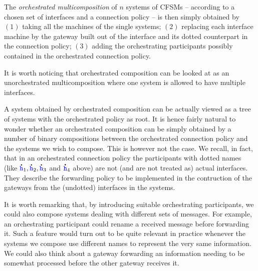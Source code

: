 \noindent
The \emph{orchestrated multicomposition} of $n$ systems of CFSMs -- according to
a chosen set of interfaces and a connection policy -- 
is then simply obtained by $(1)$ taking all the machines of the single systems;
$(2)$ replacing each interface machine by the gateway built out of the interface and its 
dotted counterpart in the connection policy; $(3)$ adding the 
orchestrating participants possibly contained in the orchestrated connection policy.

\medskip

It is worth noticing that orchestrated composition
can be looked at as an unorchestrated multicomposition where one system is allowed to have multiple
interfaces. 

A system obtained by orchestrated composition can be actually viewed as a tree of systems
with  the orchestrated policy as root. 
It is hence fairly natural to wonder whether an orchestrated composition can be simply obtained
by a number of binary compositions between the orchestrated connection policy and 
the systems we wish to compose. 
This is however not the case. We recall, in fact, that in an orchestrated connection policy 
the participants with dotted names (like $\accentset{\mbox{\large\bfseries .}}{{ \ensuremath{\mathtt{\color{blue}{ {h}}}} }}_1,\accentset{\mbox{\large\bfseries .}}{{ \ensuremath{\mathtt{\color{blue}{ {h}}}} }}_2,\accentset{\mbox{\large\bfseries .}}{{ \ensuremath{\mathtt{\color{blue}{ {h}}}} }}_3$ and $\accentset{\mbox{\large\bfseries .}}{{ \ensuremath{\mathtt{\color{blue}{ {h}}}} }}_4$ above) are not (and are not treated as) actual interfaces. They describe the forwarding policy to be implemented in the contruction of the gateways from the (undotted) interfaces in the systems.



  It is worth remarking that, by introducing suitable orchestrating participants, we could also  compose
systems dealing with different sets of messages.
 For example, an orchestrating participant could rename a received message before forwarding it.
Such a feature would turn out to be quite relevant in practice whenever the systems we compose
use different names to represent the very same information. 
We could also think about a gateway forwarding an information needing to be somewhat processed
before the other gateway receives it.




  

%

